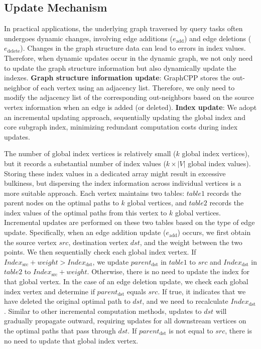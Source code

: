 \documentclass[lettersize,journal]{IEEEtran} %
\begin{document}
\subsection{Update Mechanism}
In practical applications, the underlying graph traversed by query tasks often undergoes dynamic changes, involving edge additions ($e_{\text{add}}$) and edge deletions ($e_{\text{delete}}$). Changes in the graph structure data can lead to errors in index values. Therefore, when dynamic updates occur in the dynamic graph, we not only need to update the graph structure information but also dynamically update the indexes. {\bf{Graph structure information update}}: GraphCPP stores the out-neighbor of each vertex using an adjacency list. Therefore, we only need to modify the adjacency list of the corresponding out-neighbors based on the source vertex information when an edge is added (or deleted). {\bf{Index update}}: We adopt an incremental updating approach, sequentially updating the global index and core subgraph index, minimizing redundant computation costs during index updates.

The number of global index vertices is relatively small ($k$ global index vertices), but it records a substantial number of index values ($k \times |V|$ global index values). Storing these index values in a dedicated array might result in excessive bulkiness, but dispersing the index information across individual vertices is a more suitable approach. Each vertex maintains two tables: $table1$ records the parent nodes on the optimal paths to $k$ global vertices, and $table2$ records the index values of the optimal paths from this vertex to $k$ global vertices. Incremental updates are performed on these two tables based on the type of edge update. Specifically, when an edge addition update ($e_{\text{add}}$) occurs, we first obtain the source vertex $src$, destination vertex $dst$, and the weight between the two points. We then sequentially check each global index vertex. If $Index_{\text{src}} + weight > Index_{\text{dst}}$, we update $parent_{\text{dst}}$ in $table1$ to $src$ and $Index_{\text{dst}}$ in $table2$ to $Index_{\text{src}} + weight$. Otherwise, there is no need to update the index for that global vertex. In the case of an edge deletion update, we check each global index vertex and determine if $parent_{\text{dst}}$ equals $src$. If true, it indicates that we have deleted the original optimal path to $dst$, and we need to recalculate $Index_{\text{dst}}$. Similar to other incremental computation methods, updates to $dst$ will gradually propagate outward, requiring updates for all downstream vertices on the optimal paths that pass through $dst$. If $parent_{\text{dst}}$ is not equal to $src$, there is no need to update that global index vertex.
\end{document}
